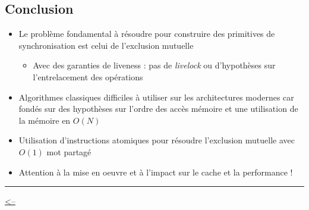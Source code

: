 \subsection{Conclusion}\label{conclusion}

\begin{itemize}
\tightlist
\item
  Le problème fondamental à résoudre pour construire des primitives de
  synchronisation est celui de l'exclusion mutuelle

  \begin{itemize}
  \tightlist
  \item
    Avec des garanties de liveness : pas de \emph{livelock} ou
    d'hypothèses sur l'entrelacement des opérations
  \end{itemize}
\item
  Algorithmes classiques difficiles à utiliser sur les architectures
  modernes car fondés sur des hypothèses sur l'ordre des accès mémoire
  et une utilisation de la mémoire en \(O(N)\)
\item
  Utilisation d'instructions atomiques pour résoudre l'exclusion
  mutuelle avec \(O(1)\) mot partagé
\item
  Attention à la mise en oeuvre et à l'impact sur le cache et la
  performance !
\end{itemize}

\begin{center}\rule{0.5\linewidth}{0.5pt}\end{center}

\href{../README.md}{\textless--}
